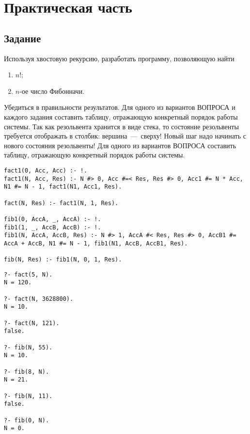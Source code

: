 \setcounter{page}{3}

\chapter{Практическая часть}
\section{Задание}
Используя хвостовую рекурсию, разработать программу, позволяющую найти

\begin{enumerate}
	\item $n!$;
	\item $n$-ое число Фибонначи.
\end{enumerate}

Убедиться в правильности результатов. Для одного из вариантов ВОПРОСА и каждого задания составить таблицу, отражающую конкретный порядок работы системы. Так как резольвента хранится в виде стека, то состояние резольвенты требуется отображать в столбик: вершина~---~сверху! Новый шаг надо начинать с нового состояния резольвенты! Для одного из вариантов ВОПРОСА составить таблицу, отражающую конкретный порядок работы системы.

  
\begin{lstlisting}[label=div,caption=Реализация программы на языке Prolog]
fact1(0, Acc, Acc) :- !.
fact1(N, Acc, Res) :- N #> 0, Acc #=< Res, Res #> 0, Acc1 #= N * Acc, N1 #= N - 1, fact1(N1, Acc1, Res).

fact(N, Res) :- fact1(N, 1, Res).

fib1(0, AccA, _, AccA) :- !.
fib1(1, _, AccB, AccB) :- !.
fib1(N, AccA, AccB, Res) :- N #> 1, AccA #< Res, Res #> 0, AccB1 #= AccA + AccB, N1 #= N - 1, fib1(N1, AccB, AccB1, Res).

fib(N, Res) :- fib1(N, 0, 1, Res).
\end{lstlisting}

\begin{lstlisting}[label=div,caption=Варианты вопроса]
?- fact(5, N).
N = 120.

?- fact(N, 3628800).
N = 10.

?- fact(N, 121).
false.

?- fib(N, 55).
N = 10.

?- fib(8, N).
N = 21.

?- fib(N, 11).
false.

?- fib(0, N).
N = 0.
\end{lstlisting}



